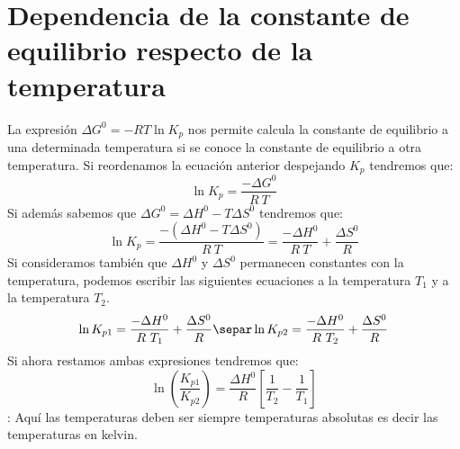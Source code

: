     \section{Dependencia de la constante de equilibrio respecto de la temperatura}\label{sec:dependencia-de-la-constante-de-equilibrio-respecto-de-la-temperatura}

    \setcounter{ejemplo}{0}
    La expresión \(\Delta G^0 = - RT\ln K_p\) nos permite calcula la constante de equilibrio a una determinada temperatura si se conoce la constante de equilibrio a otra temperatura.
    Si reordenamos la ecuación anterior despejando \(K_p\) tendremos que:
    \begin{equation*}
        \ln K_p = \dfrac{-\Delta G^0}{R\ T}
    \end{equation*}
    Si además sabemos que \(\Delta G^0 = \Delta H^0 - T\Delta S^0\) tendremos que:
    \begin{equation*}
        \ln K_p = \dfrac{-(\Delta H^0 - T\Delta S^0)}{R\ T} = \dfrac{-\Delta H^0}{R\ T} + \dfrac{\Delta S^0}{R}
    \end{equation*}
    Si consideramos también que \(\Delta H^0\) y \(\Delta S^0\) permanecen constantes con la temperatura, podemos escribir las siguientes ecuaciones a la temperatura \(T_1\) y a la temperatura \(T_2\).
    \begin{gather*}
        \ln K_{p1} =  \dfrac{-\Delta H^0}{R\ T_1} + \dfrac{\Delta S^0}{R}\separ
        \ln K_{p2} =  \dfrac{-\Delta H^0}{R\ T_2} + \dfrac{\Delta S^0}{R}
    \end{gather*}
    Si ahora restamos ambas expresiones tendremos que:
    \begin{equation}
        \ln\left(\dfrac{K_{p1}}{K_{p2}}\right) = \dfrac{\Delta H^0}{R} \left[\dfrac{1}{T_2} - \dfrac{1}{T_1} \right] \label{eq:relacion-kp-temperatura}
    \end{equation}
    : Aquí las temperaturas deben ser siempre temperaturas absolutas es decir las temperaturas en kelvin.
%
%
%
%


